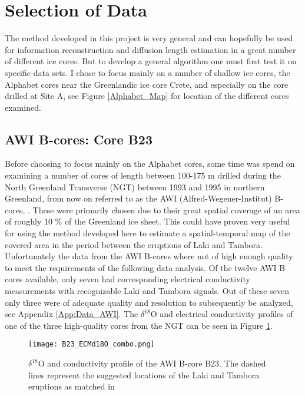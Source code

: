 \documentclass[../../CompleteThesis/Complete_1stDraft]{subfiles}
\begin{document}
\section[Selection][Selection]{Selection of Data}
\label{Sec:Data_Selection}

The method developed in this project is very general and can hopefully be used for information reconstruction and diffusion length estimation in a great number of different ice cores. But to develop a general algorithm one must first test it on specific data sets. I chose to focus mainly on a number of shallow ice cores, the Alphabet cores near the Greenlandic ice core Crete, and especially on the core drilled at Site A, see Figure \ref{Alphabet_Map} for location of the different cores examined.

\subsection[AWI B-cores]{AWI B-cores: Core B23}
\label{Subsec:Data_Selection_Bcores}
Before choosing to focus mainly on the Alphabet cores, some time was spend on examining a number of cores of length between 100-175 m drilled during the North Greenland Transverse (NGT) between 1993 and 1995 in northern Greenland, from now on referred to as the AWI (Alfred-Wegener-Institut) B-cores, \cite[Weissbach et al. 2016]{Weissbach2016}. These were primarily chosen due to their great spatial coverage of an area of roughly 10 \% of the Greenland ice sheet. This could have proven very useful for using the method developed here to estimate a spatial-temporal map of the covered area in the period between the eruptions of Laki and Tambora. Unfortunately the data from the AWI B-cores where not of high enough quality to meet the requirements of the following data analysis. Of the twelve AWI B cores available, only seven had corresponding electrical conductivity measurements with recognizable Laki and Tambora signals. Out of these seven only three were of adequate quality and resolution to subsequently be analyzed, see Appendix \ref{App:Data_AWI}. The $\delta^{18}$O and electrical conductivity profiles of one of the three high-quality cores from the NGT can be seen in Figure \ref{fig:B23_ECMd18O_combo}.

\begin{figure}[h]
	\centering
	\texttt{[image: B23\_ECMd18O\_combo.png]}
	\caption[]{$\delta^{18}$O and conductivity profile of the AWI B-core B23. The dashed lines represent the suggested locations of the Laki and Tambora eruptions as matched in \cite[Weissbach et al. 2016]{Weissbach2016}}
	\label{fig:B23_ECMd18O_combo}
\end{figure}
\end{document}
